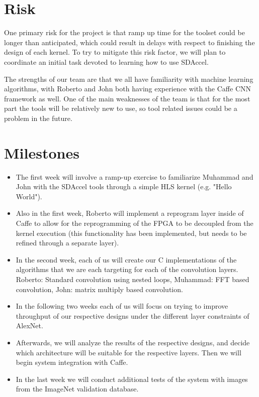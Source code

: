 \documentclass[conference,compsoc]{IEEEtran/IEEEtran}
\begin{document}
\section{Risk}\label{section:risk}

One primary risk for the project is that ramp up time for the toolset could be longer than 
anticipated, which could result in delays with respect to finishing the design of each kernel. 
To try to mitigate this risk factor, we will plan to coordinate an initial task devoted to
learning how to use SDAccel. 

The strengths of our team are that we all have familiarity with machine learning algorithms,
with Roberto and John both having experience with the Caffe CNN framework as well. One of the 
main weaknesses of the team is that for the most part the tools will be relatively new to use,
so tool related issues could be a problem in the future. 

\section{Milestones}\label{section:milestones}
\begin{itemize}
    \item The first week will involve a ramp-up exercise to familiarize Muhammad and John with 
	the SDAccel tools through a simple HLS kernel (e.g. "Hello World"). 
    \item Also in the first week, Roberto will implement a reprogram layer inside of Caffe to 
	allow for the reprogramming of the FPGA to be decoupled from the kernel execution 
	(this functionality has been implemented, but needs to be refined through a separate layer). 
    \item In the second week, each of us will create our C implementations of the algorithms 
	that we are each targeting for each of the convolution layers. Roberto: Standard convolution 
	using nested loops, Muhammad: FFT based convolution, John: matrix multiply based convolution. 
    \item In the following two weeks each of us will focus on trying to improve throughput of our 
	respective designs under the different layer constraints of AlexNet.
    \item Afterwards, we will analyze the results of the respective designs, and decide which 
	architecture will be suitable for the respective layers. Then we will begin system integration 
	with Caffe.
    \item In the last week we will conduct additional tests of the system with images from the 
	ImageNet validation database. 
\end{itemize}




\end{document}
